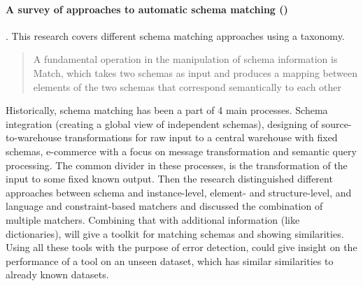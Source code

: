 \paragraph{A survey of approaches to automatic schema matching (\cite{Rahm2001-ei})}. This research covers different schema matching approaches using a taxonomy. 
\blockquote{A fundamental operation in the manipulation of schema information is Match, which takes two schemas as input and produces a mapping between elements of the two schemas that correspond semantically to each other}
Historically, schema matching has been a part of 4 main processes. Schema integration (creating a global view of independent schemas), designing of source-to-warehouse transformations for raw input to a central warehouse with fixed schemas, e-commerce with a focus on message transformation and semantic query processing. 
The common divider in these processes, is the transformation of the input to some fixed known output.  
Then the research distinguished different approaches between schema and instance-level, element- and structure-level, and language and constraint-based matchers and discussed the combination of multiple matchers. Combining that with additional information (like dictionaries), will give a toolkit for matching schemas and showing similarities. 
Using all these tools with the purpose of error detection, could give insight on the performance of a tool on an unseen dataset, which has similar similarities to already known datasets.

